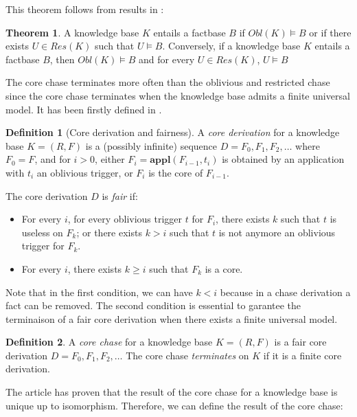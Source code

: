 \documentclass{article}
\theoremstyle{definition}
\newtheorem{definition}{Definition}[section]
\newtheorem{theorem}{Theorem}[section]
\theoremstyle{remark}
\newcommand{\Appl}{\textbf{appl}}
\begin{document}
This theorem follows from results in \cite{obl_res}:

\begin{theorem}
A knowledge base $K$ entails a factbase $B$ if $\textit{Obl}(K) \vDash B$ or if there exists $U \in \textit{Res}(K)$ such that $U \vDash B$. Conversely, if a knowledge base $K$ entails a factbase $B$, then $\textit{Obl}(K) \vDash B$ and for every $U \in \textit{Res}(K)$, $U \vDash B$
\end{theorem}


The core chase terminates more often than the oblivious and restricted chase since the core chase terminates when the knowledge base admits a finite universal model. It has been firstly defined in \cite{core_chase}.

\begin{definition}[Core derivation and fairness]
A \emph{core derivation} for a knowledge base $K = (R,F)$ is a (possibly infinite) sequence $D = F_0, F_1, F_2, \ldots$ where $F_0 = F$, and for $i >0$, either $F_{i}= \Appl(F_{i-1},t_i)$ is obtained by an application with $t_i$ an oblivious trigger, or $F_i$ is the core of $F_{i-1}$. 

The core derivation $D$ is \emph{fair} if:
\begin{itemize}
\item For every $i$, for every oblivious trigger $t$ for $F_i$, there exists $k$ such that $t$ is useless on $F_k$; or there exists $k > i$ such that $t$ is not anymore an oblivious trigger for $F_k$.
\item For every $i$, there exists $k \geq i$ such that $F_k$ is a core.

\end{itemize}
\end{definition}

Note that in the first condition, we can have $k <i$ because in a chase derivation a fact can be removed. The second condition is essential to garantee the terminaison of a fair core derivation when there exists a finite universal model.

\begin{definition}
A \emph{core chase} for a knowledge base $K= (R,F)$ is a fair core derivation $D=F_0,F_1,F_2,\ldots$ The core chase \emph{terminates} on $K$ if it is a finite core derivation.
\end{definition}

The article \cite{core_chase} has proven that the result of the core chase for a knowledge base is unique up to isomorphism. Therefore, we can define the result of the core chase:
\end{document}
